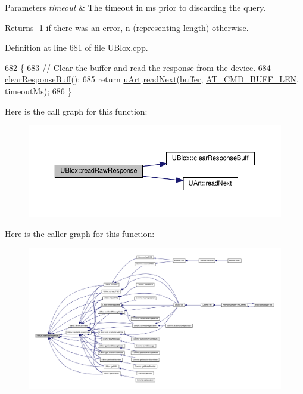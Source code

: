 \begin{DoxyParams}{Parameters}
{\em timeout} & The timeout in ms prior to discarding the query. \\
\hline
\end{DoxyParams}
\begin{DoxyReturn}{Returns}
-\/1 if there was an error, n (representing length) otherwise. 
\end{DoxyReturn}


Definition at line 681 of file U\+Blox.\+cpp.


\begin{DoxyCode}
682 \{
683     \textcolor{comment}{// Clear the buffer and read the response from the device.}
684     \hyperlink{class_u_blox_afc846fbcb1cbd49057b5ce39cd0e0dd6}{clearResponseBuff}();
685     \textcolor{keywordflow}{return} \hyperlink{class_u_blox_a034c0463d1c199d094d657c8ebb151e8}{uArt}.\hyperlink{class_u_art_aa4818ca67447e251680b4b8d28c8bba5}{readNext}(\hyperlink{class_u_blox_a6ca4b90f3dc4e856181dce1ebda6f82c}{buffer}, \hyperlink{_u_blox_8h_aad458adf8f40cbcc1074061f226a112e}{AT\_CMD\_BUFF\_LEN}, timeoutMs);
686 \}
\end{DoxyCode}
Here is the call graph for this function\+:\nopagebreak
\begin{figure}[H]
\begin{center}
\leavevmode
\includegraphics[width=350pt]{da/df6/class_u_blox_ab4a7ab4b8922d91e23f273ae160c1bed_cgraph}
\end{center}
\end{figure}
Here is the caller graph for this function\+:\nopagebreak
\begin{figure}[H]
\begin{center}
\leavevmode
\includegraphics[width=350pt]{da/df6/class_u_blox_ab4a7ab4b8922d91e23f273ae160c1bed_icgraph}
\end{center}
\end{figure}
\mbox{\label{class_u_blox_a4eaca5b1b1c4b5b6f6164b220dd43e0b}} 
